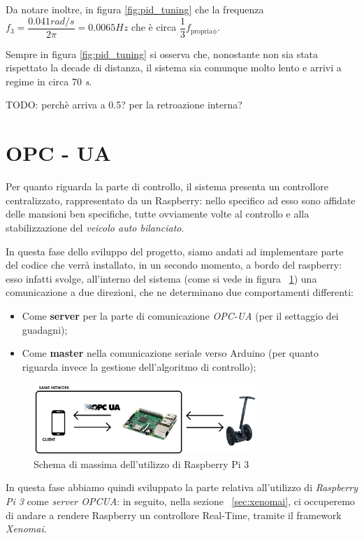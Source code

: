 Da notare inoltre, in figura \ref{fig:pid_tuning} che la frequenza $f_3 = \dfrac{0.041 \textit{rad/s}}{2\pi} = 0.0065 Hz$ che è circa $\dfrac{1}{3} 	f_{\mathrm{propria\phi}}$.

Sempre in figura \ref{fig:pid_tuning} si osserva che, nonostante non sia stata rispettato la decade di distanza, il sistema sia comunque molto lento e arrivi a regime in circa 70 \textit{s}.

TODO: perchè arriva a 0.5? per la retroazione interna?

\section{OPC - UA}
Per quanto riguarda la parte di controllo, il sistema presenta un controllore centralizzato, rappresentato da un Raspberry: nello specifico ad esso sono affidate delle mansioni ben specifiche, tutte ovviamente volte al controllo e alla stabilizzazione del \textit{veicolo auto bilanciato}.

In questa fase dello sviluppo del progetto, siamo andati ad implementare parte del codice che verrà installato, in un secondo momento, a bordo del raspberry: esso infatti svolge, all'interno del sistema (come si vede in figura ~\ref{fig:OPCUA_schema}) una comunicazione a due direzioni, che ne determinano due comportamenti differenti:
\begin{itemize}
	\item Come \textbf{server} per la parte di comunicazione \textit{OPC-UA} (per il settaggio dei guadagni);
	\item Come \textbf{master} nella comunicazione seriale verso Arduino (per quanto riguarda invece la gestione dell'algoritmo di controllo);
\end{itemize}

 \begin{figure}[H]
	\centering   	
	\includegraphics[width=0.75\textwidth]{Immagini/OPCUA_schema.png}
	\caption{Schema di massima dell'utilizzo di Raspberry Pi 3}
	\label{fig:OPCUA_schema}
\end{figure}

In questa fase abbiamo quindi sviluppato la parte relativa all'utilizzo di \textit{Raspberry Pi 3} come \textit{server OPCUA}: in seguito, nella sezione ~\ref{sec:xenomai}, ci occuperemo di andare a rendere Raspberry un controllore Real-Time, tramite il framework \textit{Xenomai}.

